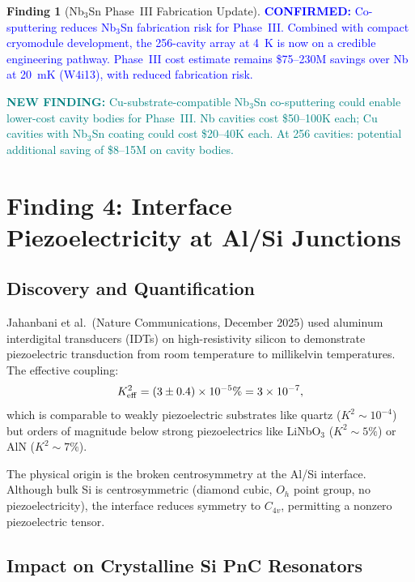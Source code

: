 \documentclass[11pt]{article}
\theoremstyle{definition}
\newtheorem{finding}[theorem]{Finding}
\theoremstyle{remark}
\newcommand{\ee}[1]{\times 10^{#1}}
\newcommand{\confirmed}[1]{\textcolor{blue}{\textbf{CONFIRMED:} #1}}
\newcommand{\newfinding}[1]{\textcolor{teal}{\textbf{NEW FINDING:} #1}}
\begin{document}
\begin{finding}[Nb$_3$Sn Phase~III Fabrication Update]
\label{find:nb3sn_update}
\confirmed{Co-sputtering reduces Nb$_3$Sn fabrication risk for
Phase~III. Combined with compact cryomodule development, the 256-cavity
array at 4~K is now on a credible engineering pathway. Phase~III
cost estimate remains \$75--230M savings over Nb at 20~mK (W4i13),
with reduced fabrication risk.}

\newfinding{Cu-substrate-compatible Nb$_3$Sn co-sputtering could
enable lower-cost cavity bodies for Phase~III. Nb cavities cost
\$50--100K each; Cu cavities with Nb$_3$Sn coating could cost
\$20--40K each. At 256 cavities: potential additional saving of
\$8--15M on cavity bodies.}
\end{finding}


\section{Finding 4: Interface Piezoelectricity at Al/Si Junctions}
\label{sec:interface_piezo}

\subsection{Discovery and Quantification}

Jahanbani et al.\ (Nature Communications, December 2025) used
aluminum interdigital transducers (IDTs) on high-resistivity silicon
to demonstrate piezoelectric transduction from room temperature to
millikelvin temperatures. The effective coupling:
\begin{equation}
K^2_{\rm eff} = (3 \pm 0.4) \times 10^{-5}\%
= 3\ee{-7},
\label{eq:k2_interface}
\end{equation}
which is comparable to weakly piezoelectric substrates like quartz
($K^2 \sim 10^{-4}$) but orders of magnitude below strong
piezoelectrics like LiNbO$_3$ ($K^2 \sim 5\%$) or AlN ($K^2 \sim 7\%$).

The physical origin is the broken centrosymmetry at the Al/Si
interface. Although bulk Si is centrosymmetric (diamond cubic,
$O_h$ point group, no piezoelectricity), the interface reduces
symmetry to $C_{4v}$, permitting a nonzero piezoelectric tensor.

\subsection{Impact on Crystalline Si PnC Resonators}
\end{document}
